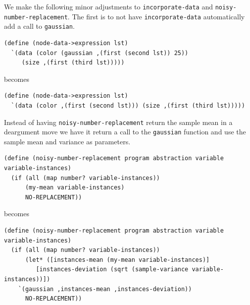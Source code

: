 \documentclass[a4paper,10pt]{article}
\begin{document}
We make the following minor adjustments to \texttt{incorporate-data} and \texttt{noisy-number-replacement}. The first is to not have \texttt{incorporate-data} automatically add a call to \texttt{gaussian}.
\begin{lstlisting}[frame=trBLsingle]
(define (node-data->expression lst)
  `(data (color (gaussian ,(first (second lst)) 25))
	 (size ,(first (third lst)))))
\end{lstlisting}
becomes
\begin{lstlisting}[frame=trBLsingle]
(define (node-data->expression lst)
  `(data (color ,(first (second lst))) (size ,(first (third lst)))))
\end{lstlisting}
Instead of having \texttt{noisy-number-replacement} return the sample mean in a deargument move we have it return a call to the \texttt{gaussian} function and use the sample mean and variance as parameters.
\begin{lstlisting}[frame=trBL]
(define (noisy-number-replacement program abstraction variable variable-instances)
  (if (all (map number? variable-instances))
      (my-mean variable-instances)
      NO-REPLACEMENT))
\end{lstlisting}
becomes
\begin{lstlisting}[frame=trBLsingle]
(define (noisy-number-replacement program abstraction variable variable-instances)
  (if (all (map number? variable-instances))
      (let* ([instances-mean (my-mean variable-instances)]
	     [instances-deviation (sqrt (sample-variance variable-instances))])
	`(gaussian ,instances-mean ,instances-deviation))
      NO-REPLACEMENT))
\end{lstlisting}
\end{document}
